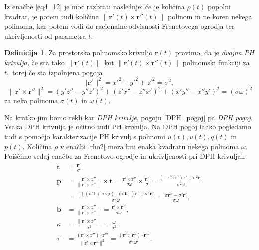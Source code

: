 \documentclass[12pt,a4paper,twoside]{article}
\theoremstyle{definition} %
\newtheorem{definicija}{Definicija}[section]
\theoremstyle{plain} %
\numberwithin{equation}{section}  %
\newcommand{\tV}{\mathbf{t}}
\newcommand{\bV}{\mathbf{b}}
\newcommand{\pV}{\mathbf{p}}
\newcommand{\rV}{\mathbf{r}}
\begin{document}
Iz enačbe \eqref{eq4_12} je moč razbrati naslednje: če je količina $\rho(t)$ popolni kvadrat, je potem tudi količina $\lVert \rV'(t) \times \rV''(t) \rVert$ polinom in ne koren nekega polinoma, kar potem vodi do racionalne odvisnosti Frenetovega ogrodja ter ukrivljenosti od parametra $t.$
\begin{definicija}
	\label{dvojnaPH}
	Za prostorsko polinomsko krivuljo $\rV(t)$ pravimo, da je \emph{dvojna PH krivulja,} če sta tako $\lVert \rV'(t) \rVert$ kot $\lVert \rV'(t) \times \rV''(t) \rVert$ polinomski funkciji za $t,$ torej če sta izpolnjena pogoja
	\begin{equation}
		\lvert \rV' \rVert^2=x'^2+y'^2+z'^2=\sigma^2,
	\end{equation}
	\begin{equation}
		\label{DPH_pogoj}
		\lVert \rV' \times \rV'' \rVert^2=(y'z''-y''z')^2+(z'x''-z''x')^2+(x'y''-x''y')^2=(\sigma \omega)^2
	\end{equation}
	za neka polinoma $\sigma(t)$ in $\omega(t).$
\end{definicija}
Na kratko jim bomo rekli kar \emph{DPH krivulje}, pogoju \eqref{DPH_pogoj} pa \emph{DPH pogoj}. Vsaka DPH krivulja je očitno tudi PH krivulja. Na DPH pogoj lahko pogledamo tudi s pomočjo karakterizacije PH krivulj s polinomi $u(t), v(t),q(t)$ in $p(t).$ Količina $\rho$ v enačbi \eqref{rho2} mora biti enaka kvadratu nekega polinoma $\omega.$ Poiščimo sedaj enačbe za Frenetovo ogrodje in ukrivljenosti pri DPH krivuljah
\begin{align}
	\tV&=\frac{\rV'}{\sigma}, \nonumber \\
	\pV&=\frac{\rV'\times \rV''}{\lVert \rV'\times \rV'' \rVert} \times \tV =\frac{\rV'\times \rV''}{\sigma \omega}\times \frac{\rV'}{\sigma}=\frac{(-\rV'' \cdot \rV')\rV'+\sigma^2\rV''}{\sigma^2\omega} \nonumber \\
	&=\frac{-((\sigma'\tV+\sigma \kappa \pV)\cdot(\sigma\tV))\rV'+\sigma^2\rV''}{\sigma^2\omega}=\frac{\sigma\rV''-\sigma'\rV'}{\sigma\omega}, \nonumber \\
	\bV&=\frac{\rV'\times \rV''}{\lVert \rV'\times \rV'' \rVert}=\frac{\rV'\times \rV''}{\sigma\omega}, \nonumber \\
	\kappa &= \frac{\lVert \rV'\times \rV'' \rVert}{\sigma^3}=\frac{\omega}{\sigma^2}, \nonumber \\
	\tau &= \frac{(\rV'\times\rV'')\cdot\rV'''}{\lVert \rV'\times \rV'' \rVert^2}=\frac{(\rV'\times\rV'')\cdot\rV'''}{\sigma^2\omega^2}.
\end{align}
\end{document}
